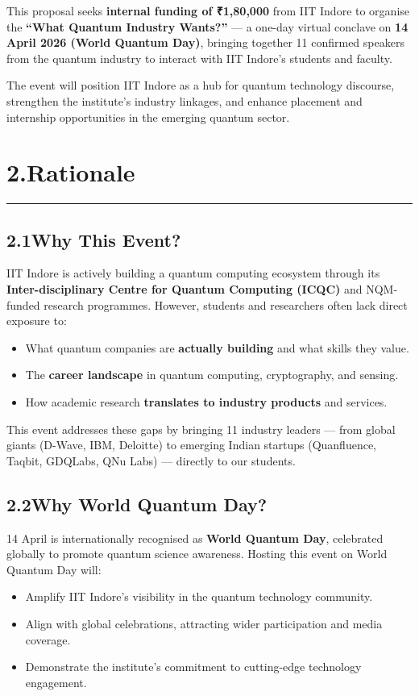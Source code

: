 \documentclass[12pt,a4paper]{article}
\begin{document}
This proposal seeks \textbf{internal funding of \textrm{₹}1,80,000} from IIT Indore to organise the \textbf{``What Quantum Industry Wants?''} --- a one-day virtual conclave on \textbf{14 April 2026 (World Quantum Day)}, bringing together 11 confirmed speakers from the quantum industry to interact with IIT Indore's students and faculty.

The event will position IIT Indore as a hub for quantum technology discourse, strengthen the institute's industry linkages, and enhance placement and internship opportunities in the emerging quantum sector.

\section*{2.\quad Rationale}
\vspace{-4pt}\hrule\vspace{6pt}

\subsection*{2.1\quad Why This Event?}

IIT Indore is actively building a quantum computing ecosystem through its \textbf{Inter-disciplinary Centre for Quantum Computing (ICQC)} and NQM-funded research programmes. However, students and researchers often lack direct exposure to:

\begin{itemize}
  \item What quantum companies are \textbf{actually building} and what skills they value.
  \item The \textbf{career landscape} in quantum computing, cryptography, and sensing.
  \item How academic research \textbf{translates to industry products} and services.
\end{itemize}

This event addresses these gaps by bringing 11 industry leaders --- from global giants (D-Wave, IBM, Deloitte) to emerging Indian startups (Quanfluence, Taqbit, GDQLabs, QNu Labs) --- directly to our students.

\subsection*{2.2\quad Why World Quantum Day?}

14 April is internationally recognised as \textbf{World Quantum Day}, celebrated globally to promote quantum science awareness. Hosting this event on World Quantum Day will:
\begin{itemize}
  \item Amplify IIT Indore's visibility in the quantum technology community.
  \item Align with global celebrations, attracting wider participation and media coverage.
  \item Demonstrate the institute's commitment to cutting-edge technology engagement.
\end{itemize}
\end{document}
